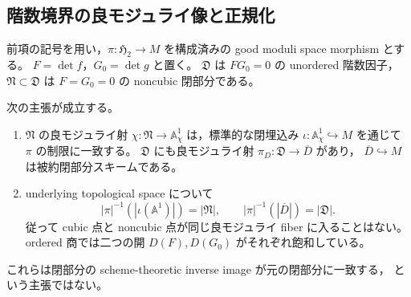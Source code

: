 
\subsection{階数境界の良モジュライ像と正規化}
\label{subsec:qa-global-good-moduli-boundary-images}

前項の記号を用い，$\pi:\mathfrak H_2\to M$ を構成済みの
good moduli space morphism とする。
$F=\det f$，$G_0=\det g$ と置く。
$\mathfrak D$ は $FG_0=0$ の unordered 階数因子，
$\mathfrak N\subset\mathfrak D$ は $F=G_0=0$ の noncubic 閉部分である。

\begin{proposition}[閉境界の良モジュライと階数の飽和性]
\label{prop:qa-global-closed-boundary-good-images}
次の主張が成立する。
\begin{enumerate}
\item $\mathfrak N$ の良モジュライ射
      $\chi:\mathfrak N\to\mathbb A^1_\chi$ は，標準的な閉埋込み
      $\iota:\mathbb A^1_\chi\hookrightarrow M$ を通じて $\pi$ の制限に一致する。
      $\mathfrak D$ にも良モジュライ射
      $\pi_D:\mathfrak D\to\overline D$ があり，
      $\overline D\hookrightarrow M$ は被約閉部分スキームである。
\item underlying topological space について
      \[
       |\pi|^{-1}(|\iota(\mathbb A^1)|)=|\mathfrak N|,
       \qquad
       |\pi|^{-1}(|\overline D|)=|\mathfrak D|.
      \]
      従って cubic 点と noncubic 点が同じ良モジュライ fiber に入ることはない。
      ordered 商では二つの開 $D(F),D(G_0)$ がそれぞれ飽和している。
\end{enumerate}
これらは閉部分の scheme-theoretic inverse image が元の閉部分に一致する，
という主張ではない。
\end{proposition}
